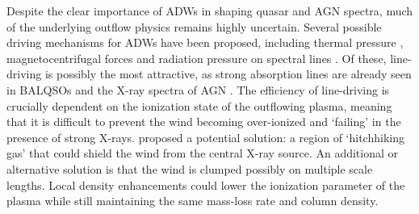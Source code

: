\documentclass[useAMS,usenatbib]{mn2e_x}
\begin{document}
Despite the clear importance of ADWs in shaping quasar and AGN spectra,  
much of the underlying outflow physics remains highly uncertain. 
Several possible driving mechanisms for ADWs have been proposed, including
thermal pressure \citep{weymann1982, begelman1991}, magnetocentrifugal forces 
\citep{blandfordpayne,pelletier_pudritz} and 
radiation pressure on spectral lines \citep[`line-driving';][]{lucysolomon1970,shlosman1985,MCGV95}.
Of these, line-driving is possibly the most attractive, as
strong absorption lines are already seen in BALQSOs and the X-ray spectra of AGN 
\citep{reeves2003,poundsreeves2009,tombesi2010a}.
The efficiency of line-driving is crucially dependent on the ionization state 
of the outflowing plasma, meaning that it is difficult to prevent 
the wind becoming over-ionized and `failing' in the presence of strong X-rays. 
\cite{MCGV95} proposed a potential solution: 
a region of `hitchhiking gas' that could shield the wind from the central X-ray source. 
An additional or alternative solution is that the wind is clumped \citep[e.g.][]{hamann2013}
possibly on multiple scale lengths. Local density enhancements could lower the 
ionization parameter of the plasma while still maintaining the same mass-loss 
rate and column density. 
\end{document}
